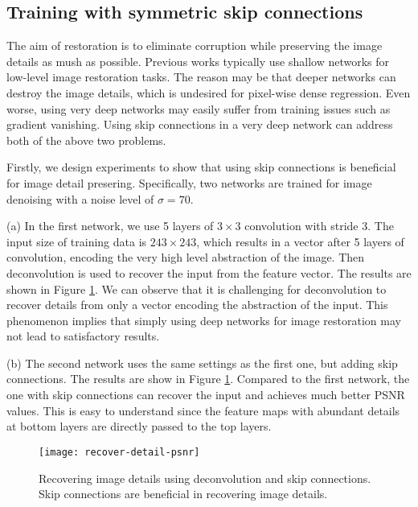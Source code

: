 \subsection{Training with symmetric skip connections}

The aim of restoration is to eliminate corruption while preserving the image details
as mush as possible. Previous works typically use shallow networks for low-level image
restoration tasks. The reason may be that deeper networks can destroy the image details,
which is undesired for pixel-wise dense regression. Even worse, using very deep networks
may easily suffer from training issues such as gradient vanishing. Using skip
connections in a very deep network can address both  of the above two problems.

Firstly, we design experiments to show that using skip connections is beneficial for
image detail presering. Specifically, two networks are trained for image denoising
with a noise level of $\sigma=70$.

(a) In the first network, we use 5 layers of $3\times3$ convolution with stride 3.
The input size of training data is $243\times243$, which results in a vector after
5 layers of convolution, encoding the very high level abstraction of the image. Then
deconvolution is used to recover the input from the feature vector. The results are
shown in Figure \ref{fig5}. We can observe that it is challenging for deconvolution to recover
details from only a vector encoding the abstraction of the input. This phenomenon
implies that  simply using deep networks for image restoration may not lead to satisfactory results.
%
%

(b) The second network uses the same settings as the first one, but adding
skip connections. The results are show in Figure \ref{fig5}. Compared to the first
network, the one with skip connections can recover the input and achieves much
better PSNR values. This is easy to understand since the feature maps with abundant
details at bottom layers are directly passed to the top layers.

\begin{figure}[htb!]
\centering
\texttt{[image: recover-detail-psnr]}
\caption{Recovering image details using deconvolution and skip connections. Skip
connections are beneficial in recovering image details.}
\label{fig5}
\end{figure}


